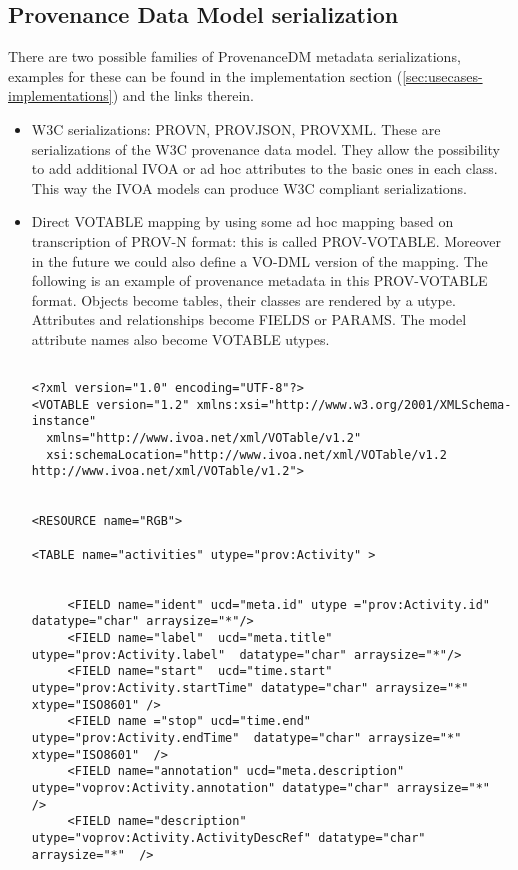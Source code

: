 \subsection{Provenance Data Model serialization}
There are two possible families of ProvenanceDM metadata serializations, examples for these can be found in the implementation section (\ref{sec:usecases-implementations}) and the links therein.
\begin{itemize}
 \item W3C serializations: PROV\-N, PROV\-JSON, PROV\-XML. These are serializations of the W3C provenance data model. They allow the possibility to add additional IVOA or ad hoc attributes to the basic ones in each class. This way the IVOA models can produce W3C compliant serializations.


 \item Direct VOTABLE mapping by using some ad hoc mapping based on transcription of PROV-N format: this is called PROV-VOTABLE. Moreover in the future we could also define a VO-DML \citep{std:VODML} version of the mapping.
The following is an example of provenance metadata in this PROV-VOTABLE format. Objects become tables, their classes are rendered by a utype. Attributes and relationships become FIELDS or PARAMS. The model attribute names also become VOTABLE utypes.  
\begin{verbatim}

<?xml version="1.0" encoding="UTF-8"?>
<VOTABLE version="1.2" xmlns:xsi="http://www.w3.org/2001/XMLSchema-instance"
  xmlns="http://www.ivoa.net/xml/VOTable/v1.2"
  xsi:schemaLocation="http://www.ivoa.net/xml/VOTable/v1.2 http://www.ivoa.net/xml/VOTable/v1.2">


<RESOURCE name="RGB">

<TABLE name="activities" utype="prov:Activity" >

     
     <FIELD name="ident" ucd="meta.id" utype ="prov:Activity.id" datatype="char" arraysize="*"/>
     <FIELD name="label"  ucd="meta.title" utype="prov:Activity.label"  datatype="char" arraysize="*"/>
     <FIELD name="start"  ucd="time.start" utype="prov:Activity.startTime" datatype="char" arraysize="*" xtype="ISO8601" />
     <FIELD name ="stop" ucd="time.end" utype="prov:Activity.endTime"  datatype="char" arraysize="*" xtype="ISO8601"  />
     <FIELD name="annotation" ucd="meta.description" utype="voprov:Activity.annotation" datatype="char" arraysize="*"  />
     <FIELD name="description" utype="voprov:Activity.ActivityDescRef" datatype="char" arraysize="*"  />  


\end{verbatim}
\end{itemize}
